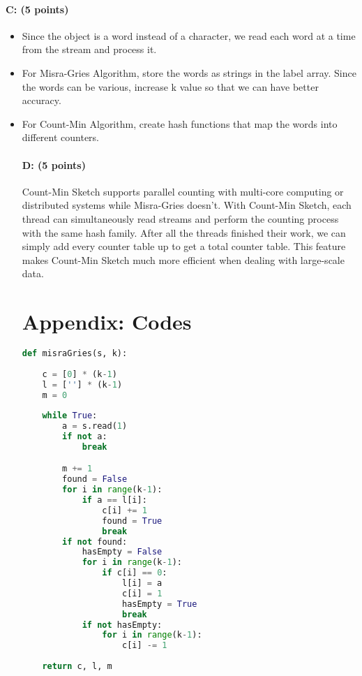 \documentclass[11pt]{article}
\begin{document}
\paragraph{C: (5 points)}
\begin{itemize}
\item Since the object is a word instead of a character, we read each word at a time from the stream and process it.
\item For Misra-Gries Algorithm, store the words as strings in the label array. Since the words can be various, increase k value so that we can have better accuracy.
\item For Count-Min Algorithm, create hash functions that map the words into different counters.

\paragraph{D: (5 points)}
Count-Min Sketch supports parallel counting with multi-core computing or distributed systems while Misra-Gries doesn't. With Count-Min Sketch, each thread can simultaneously read streams and perform the counting process with the same hash family. After all the threads finished their work, we can simply add every counter table up to get a total counter table. This feature makes Count-Min Sketch much more efficient when dealing with large-scale data.

\newpage

\section{Appendix: Codes}
\begin{lstlisting}[language=Python]
def misraGries(s, k):
    
    c = [0] * (k-1)
    l = [''] * (k-1)
    m = 0
    
    while True:
        a = s.read(1)
        if not a:
            break

        m += 1
        found = False
        for i in range(k-1):
            if a == l[i]:
                c[i] += 1
                found = True
                break
        if not found:
            hasEmpty = False
            for i in range(k-1):
                if c[i] == 0:
                    l[i] = a
                    c[i] = 1
                    hasEmpty = True
                    break
            if not hasEmpty:
                for i in range(k-1):
                    c[i] -= 1
    
    return c, l, m
    

\end{lstlisting}
\end{itemize}
\end{document}
